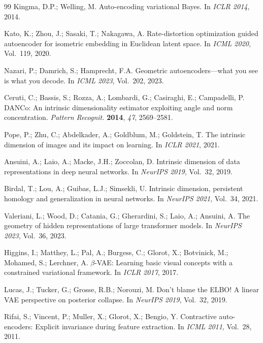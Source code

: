 \documentclass[11pt,a4paper]{article}
\begin{document}
\begin{thebibliography}{99}
Kingma, D.P.; Welling, M.
Auto-encoding variational Bayes.
In \textit{ICLR 2014}, 2014.

Kato, K.; Zhou, J.; Sasaki, T.; Nakagawa, A.
Rate-distortion optimization guided autoencoder for isometric embedding in Euclidean latent space.
In \textit{ICML 2020}, Vol.~119, 2020.

Nazari, P.; Damrich, S.; Hamprecht, F.A.
Geometric autoencoders---what you see is what you decode.
In \textit{ICML 2023}, Vol.~202, 2023.

Ceruti, C.; Bassis, S.; Rozza, A.; Lombardi, G.; Casiraghi, E.; Campadelli, P.
DANCo: An intrinsic dimensionality estimator exploiting angle and norm concentration.
\textit{Pattern Recognit.} \textbf{2014}, \textit{47}, 2569--2581.

Pope, P.; Zhu, C.; Abdelkader, A.; Goldblum, M.; Goldstein, T.
The intrinsic dimension of images and its impact on learning.
In \textit{ICLR 2021}, 2021.

Ansuini, A.; Laio, A.; Macke, J.H.; Zoccolan, D.
Intrinsic dimension of data representations in deep neural networks.
In \textit{NeurIPS 2019}, Vol.~32, 2019.

Birdal, T.; Lou, A.; Guibas, L.J.; Simsekli, U.
Intrinsic dimension, persistent homology and generalization in neural networks.
In \textit{NeurIPS 2021}, Vol.~34, 2021.

Valeriani, L.; Wood, D.; Catania, G.; Gherardini, S.; Laio, A.; Ansuini, A.
The geometry of hidden representations of large transformer models.
In \textit{NeurIPS 2023}, Vol.~36, 2023.

Higgins, I.; Matthey, L.; Pal, A.; Burgess, C.; Glorot, X.; Botvinick, M.;
Mohamed, S.; Lerchner, A.
$\beta$-VAE: Learning basic visual concepts with a constrained variational framework.
In \textit{ICLR 2017}, 2017.

Lucas, J.; Tucker, G.; Grosse, R.B.; Norouzi, M.
Don't blame the ELBO! A linear VAE perspective on posterior collapse.
In \textit{NeurIPS 2019}, Vol.~32, 2019.

Rifai, S.; Vincent, P.; Muller, X.; Glorot, X.; Bengio, Y.
Contractive auto-encoders: Explicit invariance during feature extraction.
In \textit{ICML 2011}, Vol.~28, 2011.


\end{thebibliography}
\end{document}
